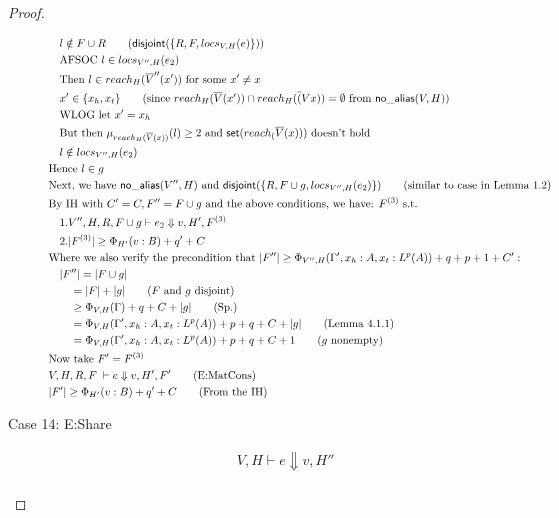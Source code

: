 \documentclass[11pt]{article}
\newcommand{\ms}[1]{\ensuremath{\mathsf{#1}}}
\newcommand{\na}[1]{\mathsf{no\_alias}(#1)}
\newcommand{\dist}[1]{\mathsf{disjoint}(#1)}
\theoremstyle{definition}
\begin{document}
\begin{proof}
\begin{description}
\begin{align*}
  &\quad l \notin F \cup R \tag{$\dist{\{R,F,locs_{V,H}(e)\}}$}\\
  &\quad \text{AFSOC } l \in locs_{V'',H}(e_2)\\
  &\quad \text{Then } l \in reach_H(\overline V'' (x')) \text{ for some } x' \ne x\\
  &\quad x' \in \{x_h,x_t\} \tag{since $reach_H(\overline V (x')) \cap reach_H(\overline (Vx)) = \emptyset$ from $\na{V,H}$}\\
  &\quad \text{WLOG let } x' = x_h\\
  &\quad \text{But then } \mu_{reach_H(\overline V(x))}(l) \ge 2 \text{ and } \ms{set}(reach_(\overline V(x))) \text{ doesn't hold}\\
  &\quad l \notin locs_{V'',H}(e_2)\\
  &\text{Hence } l \in g\\
	&\text{Next, we have } \na{V'',H} \text{ and } \dist{\{R,F \cup g,locs_{V'',H}(e_2)\}} \tag{similar to case in Lemma 1.2}\\
	&\text{By IH with } C' = C, F'' = F \cup g \text{ and the above conditions, we have: } F^{(3)} \text{ s.t.}\\
	&\quad 1. V'',H,R,F\cup g \vdash e_2 \Downarrow v,H',F^{(3)}\\
	&\quad 2. |F^{(3)}| \ge \Phi_{H'}(v:B) + q' + C\\
	&\text{Where we also verify the precondition that } |F''| \ge \Phi_{V'',H}(\Gamma',x_h:A,x_t:L^p(A)) + q + p + 1 + C':\\
	&\quad |F''| = |F \cup g|\\
	&\quad \quad = |F| + |g| \tag{$F$ and $g$ disjoint}\\
	&\quad \quad \ge \Phi_{V,H}(\Gamma) + q + C + |g| \tag{Sp.}\\
	&\quad \quad = \Phi_{V,H}(\Gamma',x_h:A,x_t:L^p(A)) + p + q + C + |g| \tag{Lemma 4.1.1}\\
	&\quad \quad = \Phi_{V,H}(\Gamma',x_h:A,x_t:L^p(A)) + p + q + C + 1 \tag{$g$ nonempty}\\
	&\text{Now take } F' = F^{(3)}\\
	&V,H,R,F \; \vdash e \Downarrow v,H',F' \tag{E:MatCons}\\
  &|F'| \ge \Phi_{H'}(v:B) + q' + C \tag{From the IH}\\
  \end{align*}
  \item[Case 14: E:Share]
	\begin{align*}
	&V,H \vdash e \Downarrow v,H'' \tag{case}\\

\end{align*}
\end{description}
\end{proof}
\end{document}
